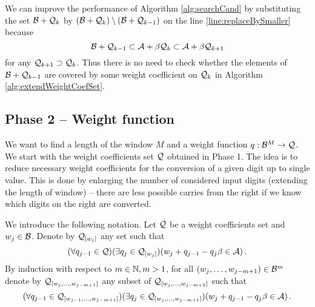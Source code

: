 We can improve the performance of Algorithm \ref{alg:searchCand} by substituting the set $\mathcal{B} + \mathcal{Q}_{k}$ by $(\mathcal{B} + \mathcal{Q}_{k})\setminus (\mathcal{B} + \mathcal{Q}_{k-1})$ on the line \ref{line:replaceBySmaller} because
$$
\mathcal{B} + \mathcal{Q}_{k-1} \subset \mathcal{A} + \beta \mathcal{Q}_{k} \subset \mathcal{A} + \beta \mathcal{Q}_{k+1}
$$
for any $\mathcal{Q}_{k+1} \supset \mathcal{Q}_{k}$. Thus there is no need to check whether the elements of $\mathcal{B} + \mathcal{Q}_{k-1}$ are covered by some weight coefficient on $\mathcal{Q}_k$ in Algorithm \ref{alg:extendWeightCoefSet}.



    

  
    
    





\subsection{Phase 2 -- Weight function}
\label{subsec:phase2}
    We want to find a length of the window $M$ and a weight function $q:\mathcal{B}^{M} \to \mathcal{Q}$. We start with the weight coefficients set $\mathcal{Q}$ obtained in Phase 1. The idea is to reduce necessary weight coefficients for the conversion of a given digit up to single value. This is done by enlarging the number of considered input digits (extending the length of window) -- there are less possible carries from the right if we know which digits on the right are converted. 
     
    We introduce the following notation. 
        Let $\mathcal{Q}$ be a weight coefficients set and $w_j\in \mathcal{B}$. Denote by $\mathcal{Q}_{[w_j]}$ any set such that
        $$
            (\forall q_{j-1} \in \mathcal{Q})(\exists q_j \in \mathcal{Q}_{[w_j]})(w_j + q_{j-1} - q_j \beta \in \mathcal{A})\,.
        $$
        By induction with respect to $m \in \mathbb{N}, m>1$, for all $(w_{j},\dots, w_{j-m+1})\in \mathcal{B}^{m}$ denote by $\mathcal{Q}_{[w_{j},\dots, w_{j-m+1}]}$ any subset of  $\mathcal{Q}_{[w_{j},\dots, w_{j-m+2}]}$ such that 
        $$
           (\forall q_{j-1} \in \mathcal{Q}_{[w_{j-1},\dots, w_{j-m+1}]})(\exists q_j \in \mathcal{Q}_{[w_{j},\dots, w_{j-m+1}]})(w_j + q_{j-1} - q_j \beta \in \mathcal{A})\,.
        $$
        
    
  
